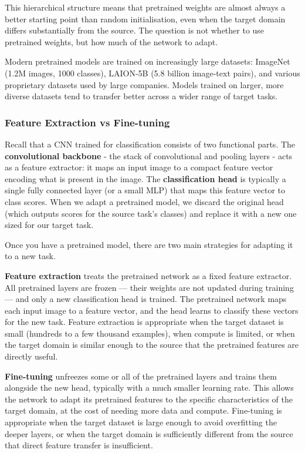 This hierarchical structure means that pretrained weights are almost always a better starting point than random initialisation, even when the target domain differs substantially from the source. The question is not whether to use pretrained weights, but how much of the network to adapt.

Modern pretrained models are trained on increasingly large datasets: ImageNet (1.2M images, 1000 classes), LAION-5B (5.8 billion image-text pairs), and various proprietary datasets used by large companies. Models trained on larger, more diverse datasets tend to transfer better across a wider range of target tasks.

\subsubsection{Feature Extraction vs Fine-tuning}

Recall that a CNN trained for classification consists of two functional parts. The \textbf{convolutional backbone} - the stack of convolutional and pooling layers - acts as a feature extractor: it maps an input image to a compact feature vector encoding what is present in the image. The \textbf{classification head} is typically a single fully connected layer (or a small MLP) that maps this feature vector to class scores. When we adapt a pretrained model, we discard the original head (which outputs scores for the source task's classes) and replace it with a new one sized for our target task.

Once you have a pretrained model, there are two main strategies for adapting it to a new task.

\textbf{Feature extraction} treats the pretrained network as a fixed feature extractor. All pretrained layers are frozen — their weights are not updated during training — and only a new classification head is trained. The pretrained network maps each input image to a feature vector, and the head learns to classify these vectors for the new task. Feature extraction is appropriate when the target dataset is small (hundreds to a few thousand examples), when compute is limited, or when the target domain is similar enough to the source that the pretrained features are directly useful.

\textbf{Fine-tuning} unfreezes some or all of the pretrained layers and trains them alongside the new head, typically with a much smaller learning rate. This allows the network to adapt its pretrained features to the specific characteristics of the target domain, at the cost of needing more data and compute. Fine-tuning is appropriate when the target dataset is large enough to avoid overfitting the deeper layers, or when the target domain is sufficiently different from the source that direct feature transfer is insufficient.

